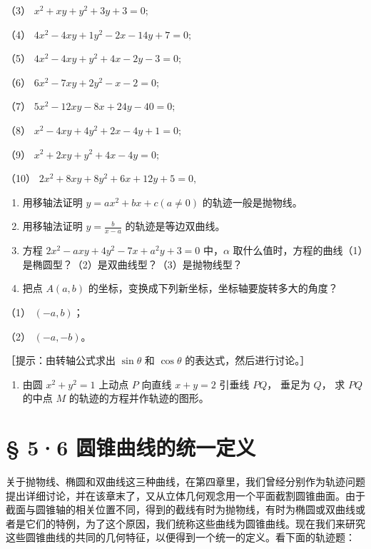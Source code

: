 （3） \(x^{2} + xy + y^{2} + 3y + 3 = 0;\)

（4） \(4x^{2} - 4xy + 1y^{2} - 2x - 14y + 7 = 0;\)

（5） \(4x^{2} - 4xy + y^{2} + 4x - 2y - 3 = 0;\)

（6） \(6x^{2} - 7xy + 2y^{2} - x - 2 = 0;\)

（7） \(5x^{2} - 12xy - 8x + 24y - 40 = 0;\)

（8） \(x^{2} - 4xy + 4y^{2} + 2x - 4y + 1 = 0;\)

（9） \(x^{2} + 2xy + y^{2} + 4x - 4y = 0;\)

（10） \(2x^{2} + 8xy + 8y^{2} + 6x + 12y + 5 = 0,\)

\begin{enumerate}
\def\labelenumi{\arabic{enumi}.}
\setcounter{enumi}{1}
\item
  用移轴法证明 \(y = ax^2 + bx + c (a \neq 0)\) 的轨迹一般是抛物线。
\item
  用移轴法证明 \(y = \frac{b}{x - a}\) 的轨迹是等边双曲线。
\item
  方程 \(2x^{2} - axy + 4y^{2} - 7x + a^{2}y + 3 = 0\) 中，\(\alpha\)
  取什么值时，方程的曲线（1）是椭圆型？（2）是双曲线型？（3）是抛物线型？
\item
  把点 \(A(a, b)\) 的坐标，变换成下列新坐标，坐标轴要旋转多大的角度？
\end{enumerate}

（1） \((-a, b)\)；

（2） \((-a, -b)\)。

［提示：由转轴公式求出 \(\sin \theta\) 和 \(\cos \theta\)
的表达式，然后进行讨论。］

\begin{enumerate}
\def\labelenumi{\arabic{enumi}.}
\setcounter{enumi}{5}
\tightlist
\item
  由圆 \(x^{2} + y^{2} = 1\) 上动点 \(P\) 向直线 \(x + y = 2\) 引垂线
  \(PQ\)， 垂足为 \(Q\)， 求 \(PQ\) 的中点 \(M\)
  的轨迹的方程并作轨迹的图形。
\end{enumerate}

\section{§ 5·6
圆锥曲线的统一定义}\label{ux5706ux9525ux66f2ux7ebfux7684ux7edfux4e00ux5b9aux4e49}

关于抛物线、椭圆和双曲线这三种曲线，在第四章里，我们曾经分别作为轨迹问题提出详细讨论，并在该章末了，又从立体几何观念用一个平面截割圆锥曲面。由于截面与圆锥轴的相关位置不同，得到的截线有时为抛物线，有时为椭圆或双曲线或者是它们的特例，为了这个原因，我们统称这些曲线为圆锥曲线。现在我们来研究这些圆锥曲线的共同的几何特征，以便得到一个统一的定义。看下面的轨迹题：

